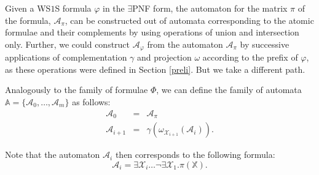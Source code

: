 Given a WS$1$S formula $\varphi$ in the $\exists$PNF form, the automaton for
the matrix $\pi$ of the formula, $\mathcal{A}_\pi$, can be constructed out of
automata corresponding to the atomic formulae and their complements by using operations of union and
intersection only. Further, we could construct $\mathcal{A}_\varphi$ from
the automaton $\mathcal{A}_\pi$ by successive applications of complementation
$\gamma$ and projection $\omega$ according to the prefix of $\varphi$, as these
operations were defined in Section \ref{preli}. But we take a different path.

% 


Analogously to the family of formulae $\Phi$, we can define
the family of automata $\mathbb{A} = \{\mathcal{A}_0,\ldots,\mathcal{A}_m\}$ as follows:
 \begin{eqnarray}
  \mathcal{A}_0 & = & \mathcal{A}_\pi\\
  \mathcal{A}_{i+1} & = & \gamma(\omega_{\mathcal{X}_{i+1}}(\mathcal{A}_i)).
 \end{eqnarray}
 
 Note that the automaton $\mathcal{A}_i$ then corresponds to the following
formula:
 \begin{equation} \mathcal{A}_i =
 \exists\mathcal{X}_i\ldots\neg\exists\mathcal{X}_1.
 \pi(\mathbb{X}).
 \end{equation}
 
